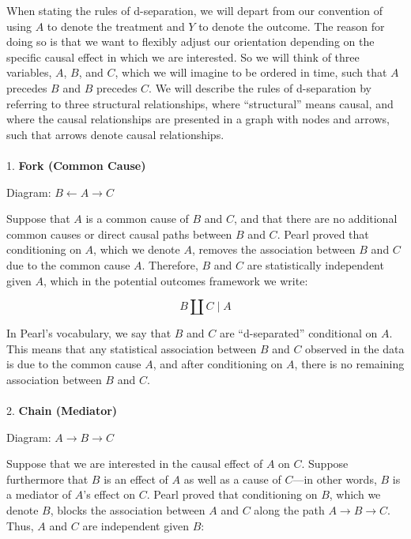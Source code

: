 \documentclass[
  singlecolumn]{article}
\makeatletter
\let\oldparagraph\paragraph
\renewcommand{\paragraph}{
    \@ifstar
      \xxxParagraphStar
      \xxxParagraphNoStar
  }
\newcommand{\xxxParagraphStar}[1]{\oldparagraph*{#1}\mbox{}}
\newcommand{\xxxParagraphNoStar}[1]{\oldparagraph{#1}\mbox{}}
\makeatother
\begin{document}
When stating the rules of d-separation, we will depart from our
convention of using \(A\) to denote the treatment and \(Y\) to denote
the outcome. The reason for doing so is that we want to flexibly adjust
our orientation depending on the specific causal effect in which we are
interested. So we will think of three variables, \(A\), \(B\), and
\(C\), which we will imagine to be ordered in time, such that \(A\)
precedes \(B\) and \(B\) precedes \(C\). We will describe the rules of
d-separation by referring to three structural relationships, where
``structural'' means causal, and where the causal relationships are
presented in a graph with nodes and arrows, such that arrows denote
causal relationships.

\paragraph{\texorpdfstring{1. \textbf{Fork (Common
Cause)}}{1. Fork (Common Cause)}}\label{fork-common-cause}

Diagram: \(B \leftarrow \boxed{A} \rightarrow C\)

Suppose that \(A\) is a common cause of \(B\) and \(C\), and that there
are no additional common causes or direct causal paths between \(B\) and
\(C\). Pearl proved that conditioning on \(A\), which we denote
\(\boxed{A}\), removes the association between \(B\) and \(C\) due to
the common cause \(A\). Therefore, \(B\) and \(C\) are statistically
independent given \(A\), which in the potential outcomes framework we
write:

\[
B \coprod C \mid A
\]

In Pearl's vocabulary, we say that \(B\) and \(C\) are ``d-separated''
conditional on \(A\). This means that any statistical association
between \(B\) and \(C\) observed in the data is due to the common cause
\(A\), and after conditioning on \(A\), there is no remaining
association between \(B\) and \(C\).

\paragraph{\texorpdfstring{2. \textbf{Chain
(Mediator)}}{2. Chain (Mediator)}}\label{chain-mediator}

Diagram: \(A \rightarrow \boxed{B} \rightarrow C\)

Suppose that we are interested in the causal effect of \(A\) on \(C\).
Suppose furthermore that \(B\) is an effect of \(A\) as well as a cause
of \(C\)---in other words, \(B\) is a mediator of \(A\)'s effect on
\(C\). Pearl proved that conditioning on \(B\), which we denote
\(\boxed{B}\), blocks the association between \(A\) and \(C\) along the
path \(A \rightarrow B \rightarrow C\). Thus, \(A\) and \(C\) are
independent given \(B\):
\end{document}
